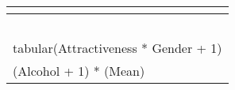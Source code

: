 \begin{table}[!tbp]
\begin{center}
\begin{tabular}{l}
\hline\hline
\multicolumn{1}{c}{}\tabularnewline
\hline
~\tabularnewline
tabular(Attractiveness * Gender + 1)\tabularnewline
(Alcohol + 1) * (Mean)\tabularnewline
\hline
\end{tabular}\end{center}
\end{table}
